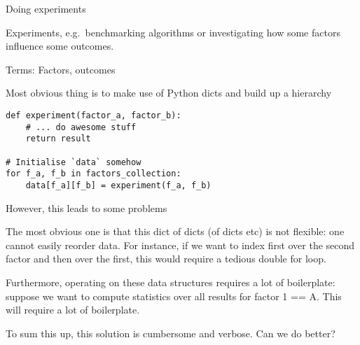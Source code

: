 Doing experiments

Experiments, e.g.\ benchmarking algorithms or investigating how some factors influence some outcomes.

Terms: Factors, outcomes

Most obvious thing is to make use of Python dicts and build up a
hierarchy

\begin{lstlisting}
def experiment(factor_a, factor_b):
    # ... do awesome stuff
    return result

# Initialise `data` somehow
for f_a, f_b in factors_collection:
    data[f_a][f_b] = experiment(f_a, f_b)
\end{lstlisting}

However, this leads to some problems

The most obvious one is that this dict of dicts (of dicts etc) is not
flexible: one cannot easily reorder data.
For instance, if we want to index first over the second factor and then over the first,
this would require a tedious double for loop.

Furthermore, operating on these data structures requires a lot of boilerplate:
suppose we want to compute statistics over all results for factor 1 == A.
This will require a lot of boilerplate.

To sum this up, this solution is cumbersome and verbose. Can we do better?
